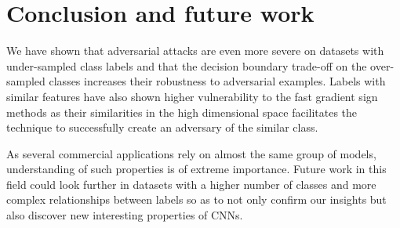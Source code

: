 \documentclass[runningheads,a4paper]{llncs}
\begin{document}
\section{Conclusion and future work}

We have shown that adversarial attacks are even more severe on datasets with under-sampled class labels and that the decision boundary trade-off on the over-sampled classes increases their robustness to adversarial examples. Labels with similar features have also shown higher vulnerability to the fast gradient sign methods as their similarities in the high dimensional space facilitates the technique to successfully create an adversary of the similar class. 

As several commercial applications rely on almost the same group of models, understanding of such properties is of extreme importance. Future work in this field could look further in datasets with a higher number of classes and more complex relationships between labels so as to not only confirm our insights but also discover new interesting properties of CNNs. 



\end{document}
